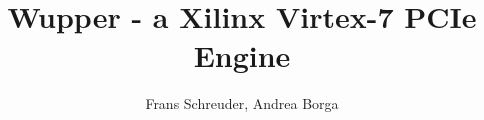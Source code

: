 \author{Frans Schreuder, Andrea Borga}
\title{\large Wupper - \small a Xilinx Virtex-7 PCIe Engine}

\date{\SetDocumentDate}
\def\DocVer{Rev 2.2}
\def\SetDocumentDate{02-05-2016}














